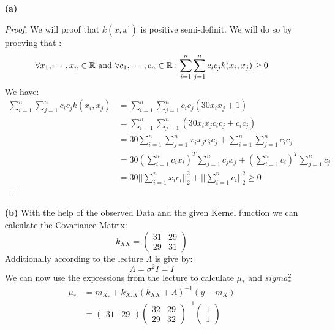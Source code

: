 \begin{itemize}  
    \item[\textbf{(a)}]
    \begin{proof}
We will proof that $k(x,x^{\prime})$ is positive semi-definit. We will do so by prooving that :
\[
\forall x_1,\cdots ,x_n \in \mathbb{R} \text{ and }\forall c_1,\cdots ,c_n \in \mathbb{R}   : \sum_{i=1}^n\sum_{j=1}^n c_ic_jk(x_i,x_j) \geq 0
\]
We have: 
\begin{align*}
    \sum_{i=1}^n\sum_{j=1}^n c_ic_jk(x_i,x_j)   &= \sum_{i=1}^n\sum_{j=1}^n c_ic_j(30x_ix_j+1)\\
                                                &= \sum_{i=1}^n\sum_{j=1}^n(30x_ix_j c_ic_j+ c_ic_j)\\
                                                &= 30\sum_{i=1}^n\sum_{j=1}^nx_ix_j c_ic_j + \sum_{i=1}^n\sum_{j=1}^nc_ic_j \\
                                                &=30(\sum_{i=1}^nc_ix_i)^T\sum_{j=1}^nc_jx_j + (\sum_{i=1}^nc_i)^T\sum_{j=1}^nc_j \\
                                                &=30||\sum_{i=1}^nx_ic_i||_2^2+||\sum_{i=1}^nc_i||_2^2 \geq 0
\end{align*}
\end{proof}
\item[\textbf{(b)}] With the help of the observed Data and the given Kernel function we can calculate the Covariance Matrix:
\[
k_{XX}= \begin{pmatrix}
    31 & 29\\
    29 & 31
    \end{pmatrix}    
\]
Additionally according to the lecture $\Lambda$ is give by:
\[
  \Lambda= \sigma^2I =   I
\]
We can now use the expressions from the lecture to calculate $\mu_*$ and $sigma^2_*$
\begin{align*}
    \mu_*   &= m_{X_*}+k_{X_*X}(k_{XX}+\Lambda)^{-1}(y-m_X) \\
            &= \begin{pmatrix}
                31 & 29
                \end{pmatrix} 
                \begin{pmatrix}
                32 & 29\\
                29 & 32
                \end{pmatrix}^{-1}
                \begin{pmatrix}
                    1 \\
                    1 
                \end{pmatrix} \\

\end{align*}
\end{itemize}
